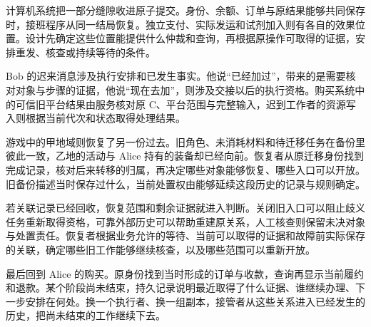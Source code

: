 计算机系统把一部分缝隙收进原子提交。身份、余额、订单与原结果能够共同保存时，接班程序从同一结局恢复。独立支付、实际发运和试剂加入则有各自的效果位置。设计先确定这些位置能提供什么仲裁和查询，再根据原操作可取得的证据，安排重发、核查或持续等待的条件。

Bob 的迟来消息涉及执行安排和已发生事实。他说“已经加过”，带来的是需要核对对象与步骤的证据，他说“现在去加”，则涉及交接以后的执行资格。购买系统中的可信旧平台结果由服务核对原 C、平台范围与完整输入，迟到工作者的资源写入则根据当前代次和状态取得处理结果。

游戏中的甲地域则恢复了另一份过去。旧角色、未消耗材料和待迁移任务在备份里彼此一致，乙地的活动与 Alice 持有的装备却已经向前。恢复者从原迁移身份找到完成记录，核对后来转移的归属，再决定哪些对象能够恢复、哪些入口可以开放。旧备份描述当时保存过什么，当前处置权由能够延续这段历史的记录与规则确定。

若关联记录已经回收，恢复范围和剩余证据就进入判断。关闭旧入口可以阻止歧义任务重新取得资格，可靠外部历史可以帮助重建原关系，人工核查则保留未决对象与处置责任。恢复者根据业务允许的等待、当前可以取得的证据和故障前实际保存的关联，确定哪些旧工作能够继续核查，以及哪些范围可以重新开放。

最后回到 Alice 的购买。原身份找到当时形成的订单与收款，查询再显示当前履约和退款。某个阶段尚未结束，持久记录说明最近取得了什么证据、谁继续办理、下一步安排在何处。换一个执行者、换一组副本，接管者从这些关系进入已经发生的历史，把尚未结束的工作继续下去。

\FloatBarrier
\clearpage
\endgroup
